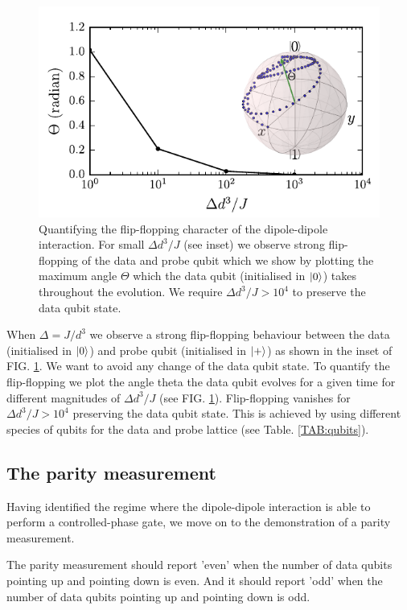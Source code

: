 \begin{figure}[H]
	\includegraphics[width=\linewidth]{../Figures/flip-flop}
	\caption{Quantifying the flip-flopping character of the dipole-dipole interaction. For small $\Delta d^3/ J$ (see inset) we observe strong flip-flopping of the data and probe qubit which we show by plotting the maximum angle $\Theta$ which the data qubit (initialised in $\ket{0}$) takes throughout the evolution. We require $\Delta d^3/ J > 10^4$ to preserve the data qubit state.}
	\label{FIG:flip-flop}
\end{figure}

When $\Delta = J/d^3$ we observe a strong flip-flopping behaviour between the data (initialised in $\ket{0}$) and probe qubit (initialised in $\ket{+}$) as shown in the inset of FIG. \ref{FIG:flip-flop}. We want to avoid any change of the data qubit state. To quantify the flip-flopping we plot the angle theta the data qubit evolves for a given time for different magnitudes of $\Delta d^3/ J$ (see FIG. \ref{FIG:flip-flop}). Flip-flopping vanishes for $\Delta d^3/ J > 10^4$ preserving the data qubit state. This is achieved by using different species of qubits for the data and probe lattice (see Table. \ref{TAB:qubits}).

\subsection{The parity measurement}
Having identified the regime where the dipole-dipole interaction is able to perform a controlled-phase gate, we move on to the demonstration of a parity measurement.

The parity measurement should report 'even' when the number of data qubits pointing up and pointing down is even. And it should report 'odd' when the number of data qubits pointing up and pointing down is odd.

